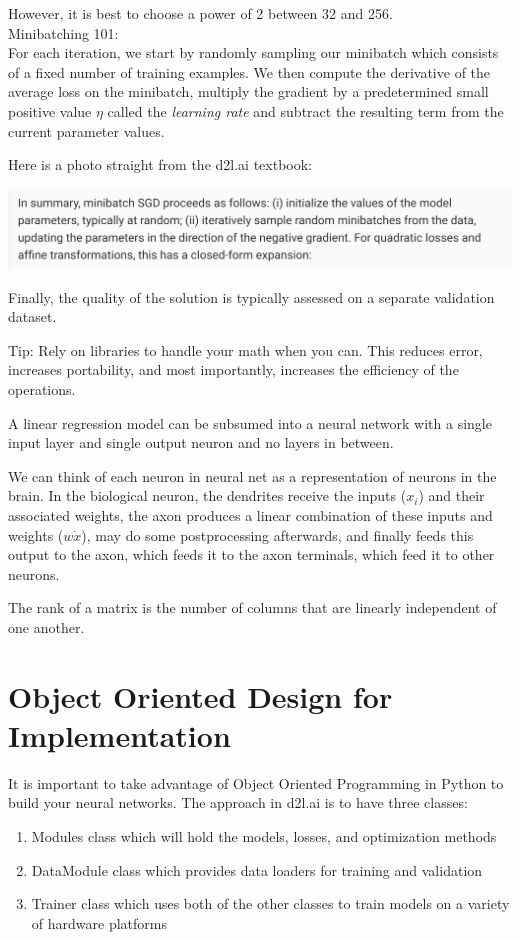 \documentclass{report}
\begin{document}
However, it is best to choose a power of 2 between 32 and 256. \\

Minibatching 101:\\

For each iteration, we start by randomly sampling our minibatch which consists of a fixed number of training examples. We then compute the derivative of the average loss on the minibatch, multiply the gradient by a predetermined small positive value $\eta$ called the \textit{learning rate} and subtract the resulting term from the current parameter values. 

Here is a photo straight from the d2l.ai textbook: 

\includegraphics[]{d2l_ai_minibatch.png}

Finally, the quality of the solution is typically assessed on a separate validation dataset. 

Tip: Rely on libraries to handle your math when you can. This reduces error, increases portability, and most importantly, increases the efficiency of the operations.

A linear regression model can be subsumed into a neural network with a single input layer and single output neuron and no layers in between. 

We can think of each neuron in neural net as a representation of neurons in the brain. In the biological neuron, the dendrites receive the inputs ($x_i$) and their associated weights, the axon produces a linear combination of these inputs and weights ($w \dot x$), may do some postprocessing afterwards, and finally feeds this output to the axon, which feeds it to the axon terminals, which feed it to other neurons. 

The rank of a matrix is the number of columns that are linearly independent of one another. 

\section{Object Oriented Design for Implementation}

It is important to take advantage of Object Oriented Programming in Python to build your neural networks. The approach in d2l.ai is to have three classes: 
\begin{enumerate}
    \item Modules class which will hold the models, losses, and optimization methods
    \item DataModule class which provides data loaders for training and validation
    \item Trainer class which uses both of the other classes to train models on a variety of hardware platforms
\end{enumerate}
\end{document}
